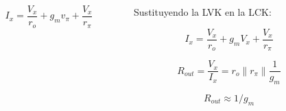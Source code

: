 \begin{frame}[t]
\begin{columns}
\begin{column}{0.5\textwidth}
            \[ I_x = \dfrac{V_x}{r_o} + g_m v_\pi + \dfrac{V_x}{r_\pi}  \]
        \end{column}
        \begin{column}{0.5\textwidth}
            \vspace{3mm}
            Sustituyendo la LVK en la LCK:

            \[ I_x = \dfrac{V_x}{r_o} + g_m V_x + \dfrac{V_x}{r_\pi}  \]

            \[ \boxed{R_{out} = \dfrac{V_x}{I_x} = r_o \parallel r_\pi \parallel \dfrac{1}{g_m}}  \]

            \[ \boxed{R_{out} \approx 1/g_m} \]
        \end{column}
    \end{columns}
\end{frame}



